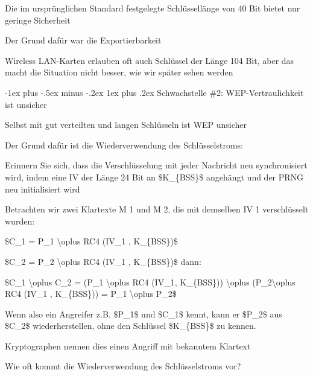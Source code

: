 \documentclass[a4paper]{article}
\makeatletter
\renewcommand{\subsubsection}{\@startsection{subsubsection}{3}{0mm}%
 {-1ex plus -.5ex minus -.2ex}%
 {1ex plus .2ex}%
 {\normalfont\small\bfseries}}
\makeatother
\begin{document}
\begin{multicols}{3}
\begin{itemize*}
            \begin{itemize*}
                  \item Die im ursprünglichen Standard festgelegte Schlüssellänge von 40 Bit bietet nur geringe Sicherheit
                  \item Der Grund dafür war die Exportierbarkeit
                  \item Wireless LAN-Karten erlauben oft auch Schlüssel der Länge 104 Bit, aber das macht die Situation nicht besser, wie wir später sehen werden
            \end{itemize*}
      \end{itemize*}


      \subsubsection{Schwachstelle \#2: WEP-Vertraulichkeit ist
            unsicher}

      \begin{itemize*}
            \item
            Selbst mit gut verteilten und langen Schlüsseln ist WEP unsicher
            \item
            Der Grund dafür ist die Wiederverwendung des Schlüsselstroms:

            \begin{itemize*}
                  \item Erinnern Sie sich, dass die Verschlüsselung mit jeder Nachricht neu synchronisiert wird, indem eine IV der Länge 24 Bit an \$K\_\{BSS\}\$ angehängt und der PRNG neu initialisiert wird
                  \item Betrachten wir zwei Klartexte M 1 und M 2, die mit demselben IV 1 verschlüsselt wurden:
                  \begin{itemize*} \item \$C\_1 = P\_1 \textbackslash oplus RC4 (IV\_1 , K\_\{BSS\})\$ \item \$C\_2 = P\_2 \textbackslash oplus RC4 (IV\_1 , K\_\{BSS\})\$ dann: \item \$C\_1 \textbackslash oplus C\_2 = (P\_1 \textbackslash oplus RC4 (IV\_1, K\_\{BSS\})) \textbackslash oplus (P\_2\textbackslash oplus RC4 (IV\_1 , K\_\{BSS\})) = P\_1 \textbackslash oplus P\_2\$ \end{itemize*}
                  \item Wenn also ein Angreifer z.B. \$P\_1\$ und \$C\_1\$ kennt, kann er \$P\_2\$ aus \$C\_2\$ wiederherstellen, ohne den Schlüssel \$K\_\{BSS\}\$ zu kennen.
                  \begin{itemize*} \item Kryptographen nennen dies einen Angriff mit bekanntem Klartext \end{itemize*}
            \end{itemize*}
            \item
            Wie oft kommt die Wiederverwendung des Schlüsselstroms vor?


\end{itemize*}
\end{multicols}
\end{document}
